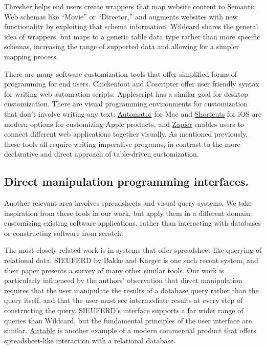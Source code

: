 \documentclass[sigplan,screen,10pt,anonymous,review]{acmart}
\begin{document}
Thresher \citep{hogue2005} helps end users create wrappers that map
website content to Semantic Web schemas like ``Movie'' or ``Director,''
and augments websites with new functionality by exploiting that schema
information. Wildcard shares the general idea of wrappers, but maps to a
generic table data type rather than more specific schemas, increasing
the range of supported data and allowing for a simpler mapping process.

There are many software customization tools that offer simplified forms
of programming for end users. Chickenfoot \citep{bolin2005} and
Coscripter \citep{leshed2008} offer user friendly syntax for writing web
automation scripts; Applescript \citep{cook2007} has a similar goal for
desktop customization. There are visual programming environments for
customization that don't involve writing any text:
\href{https://support.apple.com/guide/automator/welcome/mac}{Automator}
for Mac and
\href{https://apps.apple.com/us/app/shortcuts/id915249334}{Shortcuts}
for iOS are modern options for customizing Apple products, and
\href{https://zapier.com/}{Zapier} enables users to connect different
web applications together visually. As mentioned previously, these tools
all require writing imperative programs, in contrast to the more
declarative and direct approach of table-driven customization.

\hypertarget{direct-manipulation-programming-interfaces.}{%
\subsection{Direct manipulation programming
interfaces.}\label{direct-manipulation-programming-interfaces.}}

Another relevant area involves spreadsheets and visual query systems. We
take inspiration from these tools in our work, but apply them in a
different domain: customizing existing software applications, rather
than interacting with databases or constructing software from scratch.

The most closely related work is in systems that offer spreadsheet-like
querying of relational data. SIEUFERD by Bakke and Karger
\citep{bakke2016} is one such recent system, and their paper presents a
survey of many other similar tools. Our work is particularly influenced
by the authors' observation that direct manipulation requires that the
user manipulate the results of a database query rather than the query
itself, and that the user must see intermediate results at every step of
constructing the query. SIEUFERD's interface supports a far wider range
of queries than Wildcard, but the fundamental principles of the user
interface are similar. \href{https://airtable.com/}{Airtable} is another
example of a modern commercial product that offers spreadsheet-like
interaction with a relational database.
\end{document}
